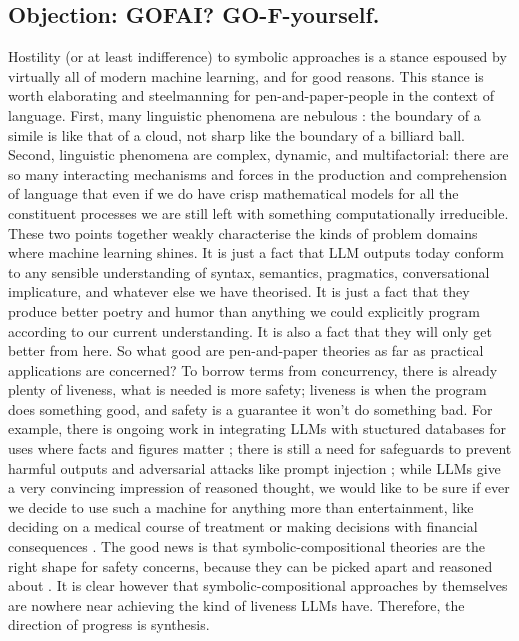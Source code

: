 \begin{fullwidth}
\begin{multicols}{2}
\subsection{\textbf{Objection:} GOFAI? GO-F-yourself.}
 
Hostility (or at least indifference) to symbolic approaches is a stance espoused by virtually all of modern machine learning, and for good reasons. This stance is worth elaborating and steelmanning for pen-and-paper-people in the context of language. First, many linguistic phenomena are nebulous \citep{}: the boundary of a simile is like that of a cloud, not sharp like the boundary of a billiard ball. Second, linguistic phenomena are complex, dynamic, and multifactorial: there are so many interacting mechanisms and forces in the production and comprehension of language that even if we do have crisp mathematical models for all the constituent processes we are still left with something computationally irreducible. These two points together weakly characterise the kinds of problem domains where machine learning shines. It is just a fact that LLM outputs today conform to any sensible understanding of syntax, semantics, pragmatics, conversational implicature, and whatever else we have theorised. It is just a fact that they produce better poetry and humor than anything we could explicitly program according to our current understanding. It is also a fact that they will only get better from here. So what good are pen-and-paper theories as far as practical applications are concerned? To borrow terms from concurrency, there is already plenty of liveness, what is needed is more safety; liveness is when the program does something good, and safety is a guarantee it won't do something bad. For example, there is ongoing work in integrating LLMs with stuctured databases for uses where facts and figures matter \citep{}; there is still a need for safeguards to prevent harmful outputs \citep{} and adversarial attacks like prompt injection \citep{}; while LLMs give a very convincing impression of reasoned thought, we would like to be sure if ever we decide to use such a machine for anything more than entertainment, like deciding on a medical course of treatment \citep{} or making decisions with financial consequences \citep{}. The good news is that symbolic-compositional theories are the right shape for safety concerns, because they can be picked apart and reasoned about \citep{}. It is clear however that symbolic-compositional approaches by themselves are nowhere near achieving the kind of liveness LLMs have. Therefore, the direction of progress is synthesis.


\end{multicols}
\end{fullwidth}
